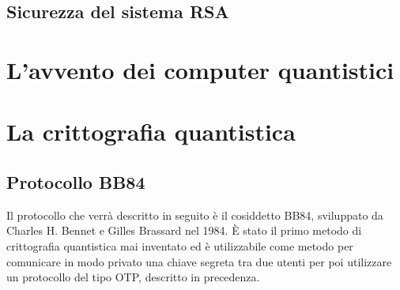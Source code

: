 \documentclass[italian,A4,12pt]{article}
\begin{document}
      \subsection{Sicurezza del sistema RSA}
  \section{L'avvento dei computer quantistici}
  \section{La crittografia quantistica}
    \subsection{Protocollo BB84}
    Il protocollo che verrà descritto in seguito è il cosiddetto BB84, sviluppato da Charles H. Bennet e Gilles Brassard nel 1984.
    È stato il primo metodo di crittografia quantistica mai inventato ed è utilizzabile come metodo per comunicare in modo privato una chiave segreta tra due utenti per poi utilizzare un protocollo del tipo OTP, descritto in precedenza.
\end{document}
